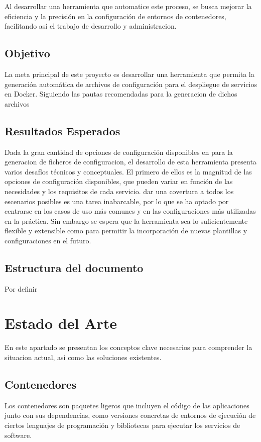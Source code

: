 \documentclass[12pt, a4paper, twoside]{article}
\begin{document}
Al desarrollar una herramienta que automatice este proceso, 
se busca mejorar la eficiencia y la precisión en la configuración de entornos de contenedores, facilitando así el trabajo de desarrollo y administracion. 

\subsection{Objetivo}
La meta principal de este proyecto es desarrollar una herramienta que permita la generación automática de archivos de configuración para el despliegue de servicios en Docker.
Siguiendo las pautas recomendadas para la generacion de dichos archivos
 

\subsection{Resultados Esperados}
Dada la gran cantidad de opciones de configuración disponibles en para la generacion de ficheros de configuracion, el desarrollo de esta herramienta presenta varios desafíos técnicos y conceptuales.
El primero de ellos es la magnitud de las opciones de configuración disponibles, que pueden variar en función de las necesidades y los requisitos de cada servicio.
dar una covertura a todos los escenarios posibles es una tarea inabarcable, por lo que se ha optado por centrarse en los casos de uso más comunes y en las configuraciones más utilizadas en la práctica.
Sin embargo se espera que la herramienta sea lo suficientemente flexible y extensible como para permitir la incorporación de nuevas plantillas y configuraciones en el futuro.


\subsection{Estructura del documento}
Por definir
















\section{Estado del Arte}
En este apartado se presentan los conceptos clave necesarios para comprender la situacion actual, asi como las soluciones existentes.
\subsection{Contenedores}
Los contenedores son paquetes ligeros que incluyen el código de las aplicaciones junto con sus dependencias, como versiones concretas de entornos de ejecución de ciertos lenguajes de programación y bibliotecas para ejecutar los servicios de software.
\end{document}
